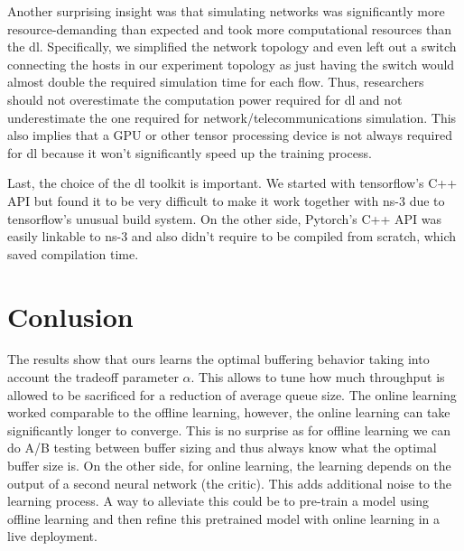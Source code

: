\documentclass[conference]{IEEEtran}
\begin{document}
Another surprising insight was that simulating networks was significantly more resource-demanding than expected and took more computational resources than the \gls{dl}. Specifically, we simplified the network topology and even left out a switch connecting the hosts in our experiment topology as just having the switch would almost double the required simulation time for each flow. Thus, researchers should not overestimate the computation power required for \gls{dl} and not underestimate the one required for network/telecommunications simulation. This also implies that a GPU or other tensor processing device is not always required for \gls{dl} because it won't significantly speed up the training process. 

Last, the choice of the \gls{dl} toolkit is important. We started with tensorflow's C++ API but found it to be very difficult to make it work together with ns-3 due to tensorflow's unusual build system. On the other side, Pytorch's C++ API was easily linkable to ns-3 and also didn't require to be compiled from scratch, which saved compilation time. 

\section{Conlusion}

The results show that \gls{ours} learns the optimal buffering behavior taking into account the tradeoff parameter $\alpha$. This allows to tune how much throughput is allowed to be sacrificed for a reduction of average queue size. The online learning worked comparable to the offline learning, however, the online learning can take significantly longer to converge. This is no surprise as for offline learning we can do A/B testing between buffer sizing and thus always know what the optimal buffer size is. On the other side, for online learning, the learning depends on the output of a second neural network (the critic). This adds additional noise to the learning process. A way to alleviate this could be to pre-train a model using offline learning and then refine this pretrained model with online learning in a live deployment. 
\end{document}
